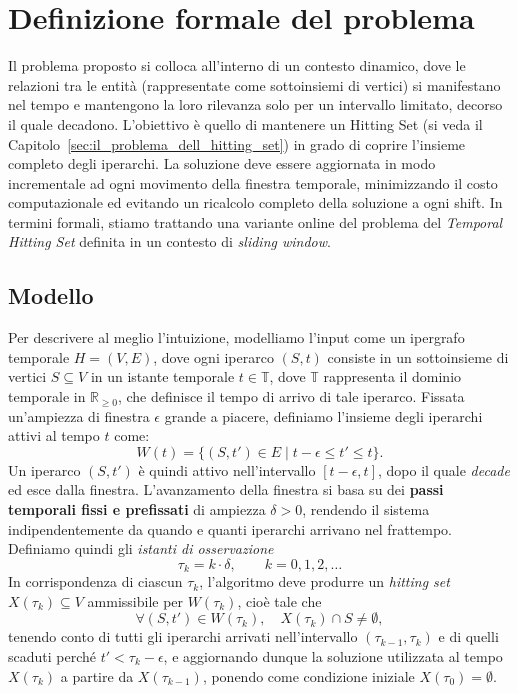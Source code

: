 
\section{Definizione formale del problema}\label{sec:definizione_formale}

Il problema proposto si colloca all'interno di un contesto dinamico, dove le relazioni tra le entità (rappresentate come sottoinsiemi di vertici) si manifestano nel tempo e mantengono la loro rilevanza solo per un intervallo limitato, decorso il quale decadono.
L'obiettivo è quello di mantenere un Hitting Set (si veda il Capitolo~\ref{sec:il_problema_dell_hitting_set}) in grado di coprire l'insieme completo degli iperarchi. La soluzione deve essere aggiornata in modo incrementale ad ogni movimento della finestra temporale, minimizzando il costo computazionale ed evitando un ricalcolo completo della soluzione a ogni shift.
In termini formali, stiamo trattando una variante online del problema del \textit{Temporal Hitting Set} definita in un contesto di \textit{sliding window}.

\subsection*{Modello}

Per descrivere al meglio l'intuizione, modelliamo l’input come un ipergrafo temporale $H = (V, E)$, dove ogni iperarco $(S, t)$ consiste in un sottoinsieme di vertici $S \subseteq V$ in un istante temporale $t \in \mathbb{T}$, dove $\mathbb{T}$ rappresenta il dominio temporale in $\mathbb{R}_{\ge 0}$, che definisce il tempo di arrivo di tale iperarco.
Fissata un'ampiezza di finestra $\epsilon$ grande a piacere, definiamo l’insieme degli iperarchi attivi al tempo $t$ come:
\[
W(t) = \{ (S, t') \in E \mid t - \epsilon \le t' \le t \}.
\]
Un iperarco $(S, t')$ è quindi attivo nell'intervallo $[t - \epsilon, t]$, dopo il quale \textit{decade} ed esce dalla finestra.
L'avanzamento della finestra si basa su dei \textbf{passi temporali fissi e prefissati} di ampiezza $\delta > 0$, rendendo il sistema indipendentemente da quando e quanti iperarchi arrivano nel frattempo.
Definiamo quindi gli \textit{istanti di osservazione}
\[
\tau_k = k \cdot \delta, \qquad k = 0, 1, 2, \dots
\]
In corrispondenza di ciascun $\tau_k$, l'algoritmo deve produrre un \textit{hitting set} $X(\tau_k) \subseteq V$ ammissibile per $W(\tau_k)$, cioè tale che
\[
\forall (S, t') \in W(\tau_k), \quad X(\tau_k) \cap S \neq \emptyset,
\]
tenendo conto di tutti gli iperarchi arrivati nell'intervallo $(\tau_{k-1}, \tau_k)$ e di quelli scaduti perché $t' < \tau_k - \epsilon$, e aggiornando dunque la soluzione utilizzata al tempo $X(\tau_{k})$ a partire da $X(\tau_{k-1})$, ponendo come condizione iniziale $X(\tau_0) = \emptyset$.

